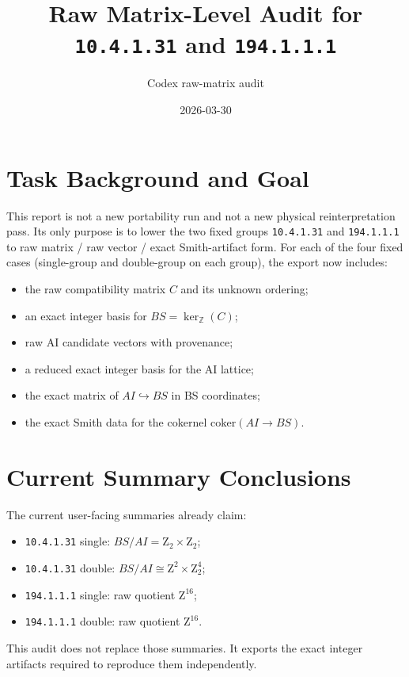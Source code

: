 \documentclass[11pt]{article}
\title{Raw Matrix-Level Audit for \texttt{10.4.1.31} and \texttt{194.1.1.1}}
\author{Codex raw-matrix audit}
\date{2026-03-30}
\begin{document}
        \maketitle

        \section{Task Background and Goal}
        This report is not a new portability run and not a new physical reinterpretation pass.
        Its only purpose is to lower the two fixed groups
        \texttt{10.4.1.31} and \texttt{194.1.1.1} to raw matrix / raw vector / exact Smith-artifact form.
        For each of the four fixed cases
        (single-group and double-group on each group),
        the export now includes:
        \begin{itemize}
        \item the raw compatibility matrix $C$ and its unknown ordering;
        \item an exact integer basis for $BS = \ker_{\mathbb Z}(C)$;
        \item raw AI candidate vectors with provenance;
        \item a reduced exact integer basis for the AI lattice;
        \item the exact matrix of $AI \hookrightarrow BS$ in BS coordinates;
        \item the exact Smith data for the cokernel $\mathrm{coker}(AI \to BS)$.
        \end{itemize}

        \section{Current Summary Conclusions}
        The current user-facing summaries already claim:
        \begin{itemize}
        \item \texttt{10.4.1.31} single: $BS/AI = \mathrm{Z}_2 \times \mathrm{Z}_2$;
        \item \texttt{10.4.1.31} double: $BS/AI \cong \mathrm{Z}^2 \times \mathrm{Z}_2^4$;
        \item \texttt{194.1.1.1} single: raw quotient $\mathrm{Z}^{16}$;
        \item \texttt{194.1.1.1} double: raw quotient $\mathrm{Z}^{16}$.
        \end{itemize}
        This audit does not replace those summaries.
        It exports the exact integer artifacts required to reproduce them independently.
\end{document}
